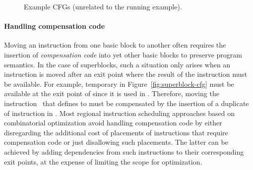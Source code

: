 \documentclass[acmsmall,authorversion,nonacm]{acmart}
\begin{document}
\begin{figure}
{{{
 }}
    \label{fig:general-cfg}
  }
  \hspace{0.1cm}
  \hfill
  \caption{Example CFGs (unrelated to the running example).}
\end{figure}

\paragraph{Handling compensation code}

Moving an instruction from one basic block to another often requires
the insertion of \emph{compensation code} into yet other basic blocks
to preserve program semantics.
In the case of superblocks, such a situation only arises when an
instruction is moved after an exit point where the result of the
instruction must be available.
For example, temporary  in Figure~\ref{fig:superblock-cfg} must be
available at the exit point of  since it is used in .
Therefore, moving the instruction~ that defines  to 
must be compensated by the insertion of a duplicate of instruction
 in .
Most regional instruction scheduling approaches based on combinatorial
optimization avoid handling compensation code by either disregarding
the additional cost of placements of instructions that require
compensation code or just disallowing such placements.
The latter can be achieved by adding dependencies from such
instructions to their corresponding exit points, at the expense of
limiting the scope for optimization.
\end{document}
